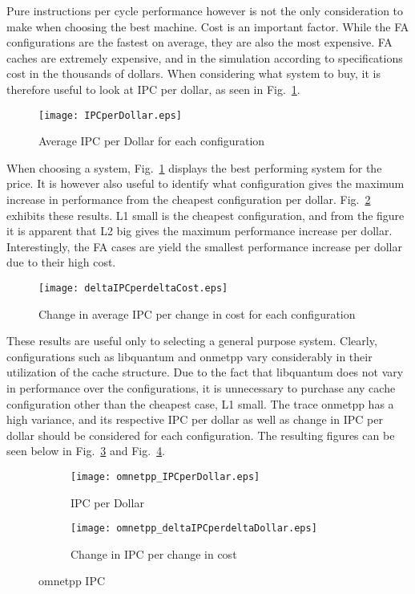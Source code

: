 \documentclass[FinalReport.tex]{subfiles}
\begin{document}
Pure instructions per cycle performance however is not the only consideration to make when choosing the best machine. Cost is an important factor. While the FA configurations are the fastest on average, they are also the most expensive. FA caches are extremely expensive, and in the simulation according to specifications cost in the thousands of dollars. When considering what system to buy, it is therefore useful to look at IPC per dollar, as seen in Fig.~\ref{fig:IPCperDollar}.

\begin{figure}[H]
\centering
\texttt{[image: IPCperDollar.eps]}
\caption{Average IPC per Dollar for each configuration\label{fig:IPCperDollar}}
\end{figure}

When choosing a system, Fig.~\ref{fig:IPCperDollar} displays the best performing system for the price. It is however also useful to identify what configuration gives the maximum increase in performance from the cheapest configuration per dollar. Fig.~\ref{fig:deltaIPCperDollar} exhibits these results. L1 small is the cheapest configuration, and from the figure it is apparent that L2 big gives the maximum performance increase per dollar. Interestingly, the FA cases are yield the smallest performance increase per dollar due to their high cost.

\begin{figure}[H]
\centering
\texttt{[image: deltaIPCperdeltaCost.eps]}
\caption{Change in average IPC per change in cost for each configuration\label{fig:deltaIPCperDollar}}
\end{figure}

 These results are useful only to selecting a general purpose system.  Clearly, configurations such as libquantum and onmetpp vary considerably in their utilization of the cache structure. Due to the fact that libquantum does not vary in performance over the configurations, it is unnecessary to purchase any cache configuration other than the cheapest case, L1 small. The trace onmetpp has a high variance, and its respective IPC per dollar as well as change in IPC per dollar should be considered for each configuration. The resulting figures can be seen below in Fig.~\ref{fig:omnetppIPCperDollar} and Fig.~\ref{fig:deltaomnetppIPCperDollar}.

\begin{figure}[H]
\centering
\begin{subfigure}[b]{0.49\textwidth}
\texttt{[image: omnetpp\_IPCperDollar.eps]}
\caption{IPC per Dollar\label{fig:omnetppIPCperDollar}}
\end{subfigure}
\begin{subfigure}[b]{0.49\textwidth}
\texttt{[image: omnetpp\_deltaIPCperdeltaDollar.eps]}
\caption{Change in IPC per change in cost\label{fig:deltaomnetppIPCperDollar}}
\end{subfigure}
\caption{omnetpp IPC}\label{fig:omnetpp}
\end{figure}
\end{document}
